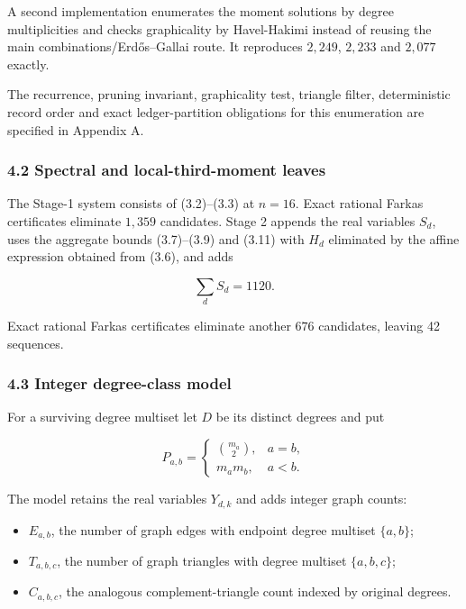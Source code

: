 \documentclass[
  english,
  11pt,
  a4paper,
]{article}
\providecommand{\tightlist}{%
  \setlength{\itemsep}{0pt}\setlength{\parskip}{0pt}}
\begin{document}
A second implementation enumerates the moment solutions by degree
multiplicities and checks graphicality by Havel-Hakimi instead of
reusing the main combinations/Erdős--Gallai route. It reproduces
\(2{,}249\), \(2{,}233\) and \(2{,}077\) exactly.

The recurrence, pruning invariant, graphicality test, triangle filter,
deterministic record order and exact ledger-partition obligations for
this enumeration are specified in Appendix A.

\subsubsection{4.2 Spectral and local-third-moment
leaves}\label{spectral-and-local-third-moment-leaves}

The Stage-1 system consists of (3.2)--(3.3) at \(n=16\). Exact rational
Farkas certificates eliminate \(1{,}359\) candidates. Stage 2 appends
the real variables \(S_d\), uses the aggregate bounds (3.7)--(3.9) and
(3.11) with \(H_d\) eliminated by the affine expression obtained from
(3.6), and adds

\[
\sum_dS_d=1120.
\]

Exact rational Farkas certificates eliminate another \(676\) candidates,
leaving 42 sequences.

\subsubsection{4.3 Integer degree-class
model}\label{integer-degree-class-model}

For a surviving degree multiset let \(D\) be its distinct degrees and
put

\[
P_{a,b}=\begin{cases}
\binom{m_a}{2},&a=b,\\
m_am_b,&a<b.
\end{cases}
\]

The model retains the real variables \(Y_{d,k}\) and adds integer graph
counts:

\begin{itemize}
\tightlist
\item
  \(E_{a,b}\), the number of graph edges with endpoint degree multiset
  \(\{a,b\}\);
\item
  \(T_{a,b,c}\), the number of graph triangles with degree multiset
  \(\{a,b,c\}\);
\item
  \(C_{a,b,c}\), the analogous complement-triangle count indexed by
  original degrees.
\end{itemize}
\end{document}

